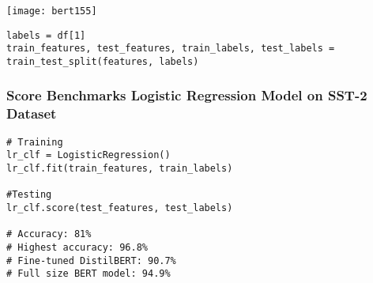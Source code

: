 \begin{frame}[fragile]\frametitle{}

			\begin{center}
			\texttt{[image: bert155]}
			\end{center}	
			
\begin{lstlisting}
labels = df[1]
train_features, test_features, train_labels, test_labels = train_test_split(features, labels)
\end{lstlisting}





\end{frame}

\begin{frame}[fragile]\frametitle{Score Benchmarks Logistic Regression Model on SST-2 Dataset }

\begin{lstlisting}
# Training
lr_clf = LogisticRegression() 
lr_clf.fit(train_features, train_labels)

#Testing
lr_clf.score(test_features, test_labels)

# Accuracy: 81%
# Highest accuracy: 96.8%
# Fine-tuned DistilBERT: 90.7%
# Full size BERT model: 94.9%
\end{lstlisting}



\end{frame}





